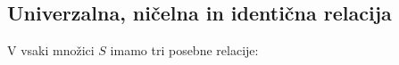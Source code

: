 \documentclass[11pt,paper=b5,footinclude,headinclude]{scrbook} %
\def\ali {{~\vee~}}
\def\inn {{~\wedge~}}
\def\sledi {{~\Rightarrow~}}
\def\brez {{\,\setminus\,}}
\def\cee {{~\Leftrightarrow~}}
\begin{document}
%
%
%
%
%
%
%
%
%
%
%
%
%
%
%
%
%
%
%
%
%
%
%
%
%
%
%
%
%
%
%
%
%
%
%


\subsection{Univerzalna, ničelna in identična relacija}

V vsaki množici $S$ imamo tri posebne relacije:
\end{document}
